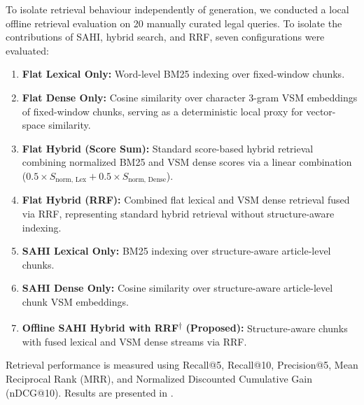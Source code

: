 To isolate retrieval behaviour independently of generation, we conducted a local offline
retrieval evaluation on 20 manually curated legal queries.  To isolate the contributions of SAHI, hybrid search, and
RRF, seven configurations were evaluated:
\begin{enumerate}
  \item \textbf{Flat Lexical Only:} Word-level BM25 indexing over fixed-window chunks.
  \item \textbf{Flat Dense Only:} Cosine similarity over character 3-gram VSM embeddings
  of fixed-window chunks, serving as a deterministic local proxy for vector-space
  similarity.
  \item \textbf{Flat Hybrid (Score Sum):} Standard score-based hybrid retrieval combining
  normalized BM25 and VSM dense scores via a linear combination ($0.5 \times S_{\text{norm, Lex}} + 0.5 \times S_{\text{norm, Dense}}$).
  \item \textbf{Flat Hybrid (RRF):} Combined flat lexical and VSM dense retrieval fused
  via RRF, representing standard hybrid retrieval without structure-aware indexing.
  \item \textbf{SAHI Lexical Only:} BM25 indexing over structure-aware article-level
  chunks.
  \item \textbf{SAHI Dense Only:} Cosine similarity over structure-aware article-level
  chunk VSM embeddings.
  \item \textbf{Offline SAHI Hybrid with RRF\textsuperscript{$\dagger$} (Proposed):} Structure-aware chunks with fused lexical
  and VSM dense streams via RRF.
\end{enumerate}

Retrieval performance is measured using Recall@5, Recall@10, Precision@5, Mean
Reciprocal Rank (MRR), and Normalized Discounted Cumulative Gain (nDCG@10). Results
are presented in .

